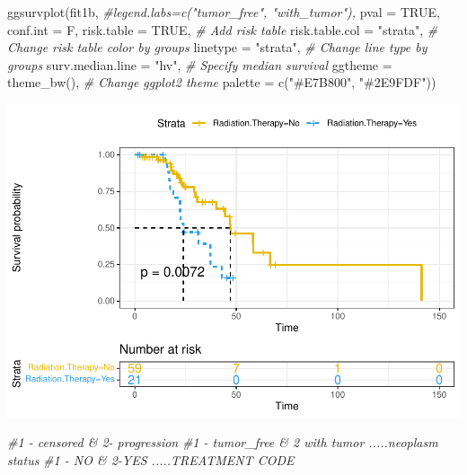 \documentclass[
  11pt,
]{article}
\newenvironment{Shaded}{\begin{snugshade}}{\end{snugshade}}
\newcommand{\AttributeTok}[1]{\textcolor[rgb]{0.77,0.63,0.00}{#1}}
\newcommand{\CommentTok}[1]{\textcolor[rgb]{0.56,0.35,0.01}{\textit{#1}}}
\newcommand{\ConstantTok}[1]{\textcolor[rgb]{0.00,0.00,0.00}{#1}}
\newcommand{\FunctionTok}[1]{\textcolor[rgb]{0.00,0.00,0.00}{#1}}
\newcommand{\NormalTok}[1]{#1}
\newcommand{\StringTok}[1]{\textcolor[rgb]{0.31,0.60,0.02}{#1}}
\begin{document}
\begin{Shaded}
\begin{Highlighting}[]
\FunctionTok{ggsurvplot}\NormalTok{(fit1b,}
          \CommentTok{\#legend.labs=c("tumor\_free", "with\_tumor"),}
          \AttributeTok{pval =} \ConstantTok{TRUE}\NormalTok{, }\AttributeTok{conf.int =}\NormalTok{ F,}
          \AttributeTok{risk.table =} \ConstantTok{TRUE}\NormalTok{, }\CommentTok{\# Add risk table}
          \AttributeTok{risk.table.col =} \StringTok{"strata"}\NormalTok{, }\CommentTok{\# Change risk table color by groups}
          \AttributeTok{linetype =} \StringTok{"strata"}\NormalTok{, }\CommentTok{\# Change line type by groups}
          \AttributeTok{surv.median.line =} \StringTok{"hv"}\NormalTok{, }\CommentTok{\# Specify median survival}
          \AttributeTok{ggtheme =} \FunctionTok{theme\_bw}\NormalTok{(), }\CommentTok{\# Change ggplot2 theme}
          \AttributeTok{palette =} \FunctionTok{c}\NormalTok{(}\StringTok{"\#E7B800"}\NormalTok{, }\StringTok{"\#2E9FDF"}\NormalTok{))}
\end{Highlighting}
\end{Shaded}

\includegraphics{new_surv_2_files/figure-latex/unnamed-chunk-8-1.pdf}

\begin{Shaded}
\begin{Highlighting}[]
\CommentTok{\#1 {-} censored \& 2{-} progression}
\CommentTok{\#1 {-} tumor\_free \& 2 with tumor .....neoplasm status }
\CommentTok{\#1 {-} NO \& 2{-}YES .....TREATMENT CODE}
\end{Highlighting}
\end{Shaded}
\end{document}
